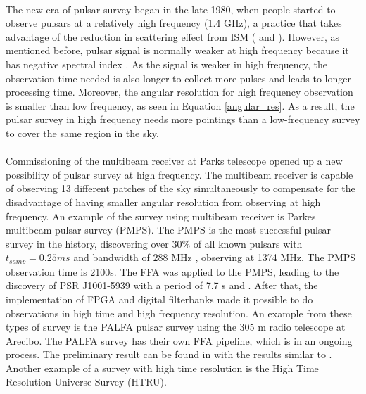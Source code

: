 \documentclass[thesis_msc.tex]{subfiles}
\begin{document}
        \paragraph{} The new era of pulsar survey began in the late 1980, when people started  to observe pulsars at a relatively high frequency (1.4 GHz), a practice that takes advantage of the reduction in scattering effect from ISM (\cite{johnston1992high} and \cite{clifton1992high}). However, as mentioned before, pulsar signal is normally weaker at high frequency because it has negative spectral index \citep{bates2013pulsar}. As the signal is weaker in high frequency, the observation time needed is also longer to collect more pulses and leads to longer processing time. Moreover, the angular resolution for high frequency observation is smaller than low frequency, as seen in Equation \ref{angular_res}. As a result, the pulsar survey in high frequency needs more pointings than a low-frequency survey to cover the same region in the sky. 
        
        \paragraph{} Commissioning of the multibeam receiver at Parks telescope \citep{staveley1997hi} opened up a new possibility of pulsar survey at high frequency. The multibeam receiver is capable of observing 13 different patches of the sky simultaneously \citep{staveley1997hi} to compensate for the disadvantage of having smaller angular resolution from observing at high frequency. An example of the survey using multibeam receiver is Parkes multibeam pulsar survey (PMPS). The PMPS is the most successful pulsar survey in the history, discovering over $30 \%$ of all known pulsars with $t_{samp}=0.25 ms$ \cite{camilo2000parkes} and bandwidth of $288$ MHz  \citep{manchester2001parkes}, observing at 1374 MHz. The PMPS observation time is 2100s.  The FFA was applied to the PMPS, leading to the discovery of PSR J1001-5939 with a period of 7.7 s \citep{Faulkner2004} and \citep{lorimer2006parkes}. After that, the implementation of FPGA and digital filterbanks made it possible to do observations in high time and high frequency resolution. An example from these types of survey is the PALFA pulsar survey \citep{cordes2006arecibo} using the 305 m radio telescope at Arecibo. The PALFA survey has their own FFA pipeline, which is in an ongoing process. The preliminary result can be found in  \cite{parent2018implementation} with the results similar to \cite{cameron2017investigation}. Another example of a survey with high time resolution is the High Time Resolution Universe Survey (HTRU).
        
\end{document}
